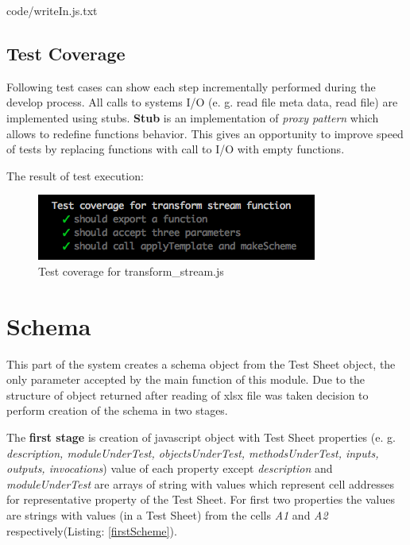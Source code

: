 
{code/writeIn.js.txt}

\subsection{Test Coverage}
Following test cases can show each step incrementally performed during the develop process. All calls to systems I/O (e. g. read file meta data, read file) are implemented using stubs. \textbf{Stub} is an implementation of \textit{proxy pattern} which allows to redefine functions behavior. This gives an opportunity to improve speed of tests by replacing functions with call to I/O with empty functions.
%

The result of test execution:
\begin{figure}[H]
	\centering
	\includegraphics[width=\linewidth]{grafiken/testTransform.png}
	\caption{Test coverage for transform\_stream.js}
	\label{fig:testTransofm}
\end{figure}


\section{Schema}
This part of the system creates a schema object from the Test Sheet object, the only parameter accepted by the main function of this module. Due to the structure of object  returned after reading of xlsx file was taken decision to perform creation of the schema in two stages.

The \textbf{first stage} is creation of javascript object with Test Sheet properties (e. g. \textit{description, moduleUnderTest, objectsUnderTest, methodsUnderTest, inputs, outputs, invocations}) value of each property except \textit{description} and \textit{moduleUnderTest} are arrays of string with values which represent cell addresses for representative property of the Test Sheet. For first two properties the values are strings with values (in a Test Sheet) from the cells \textit{A1} and \textit{A2} respectively(Listing: \ref{firstScheme}).

